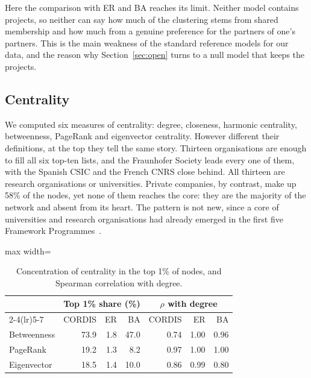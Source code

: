 \documentclass[sigchi]{acmart}
\begin{document}
Here the comparison with ER and BA reaches its limit. Neither model contains projects, so neither can say how much of the clustering stems from shared membership and how much from a genuine preference for the partners of one's partners. This is the main weakness of the standard reference models for our data, and the reason why Section~\ref{sec:open} turns to a null model that keeps the projects.

\subsection{Centrality}

We computed six measures of centrality: degree, closeness, harmonic centrality, betweenness, PageRank and eigenvector centrality. However different their definitions, at the top they tell the same story. Thirteen organisations are enough to fill all six top-ten lists, and the Fraunhofer Society leads every one of them, with the Spanish CSIC and the French CNRS close behind. All thirteen are research organisations or universities. Private companies, by contrast, make up 58\% of the nodes, yet none of them reaches the core: they are the majority of the network and absent from its heart. The pattern is not new, since a core of universities and research organisations had already emerged in the first five Framework Programmes~\cite{roediger2008}.

\begin{table}[t]
\caption{Concentration of centrality in the top 1\% of nodes, and Spearman correlation with degree.}
\label{tab:centrality}
\small
\begin{adjustbox}{max width=\columnwidth}
\begin{tabular}{lrrrrrr}
\toprule
 & \multicolumn{3}{c}{Top 1\% share (\%)} & \multicolumn{3}{c}{$\rho$ with degree} \\
\cmidrule(lr){2-4}\cmidrule(lr){5-7}
 & CORDIS & ER & BA & CORDIS & ER & BA \\
\midrule
Betweenness & 73.9 & 1.8 & 47.0 & 0.74 & 1.00 & 0.96 \\
PageRank & 19.2 & 1.3 & 8.2 & 0.97 & 1.00 & 1.00 \\
Eigenvector & 18.5 & 1.4 & 10.0 & 0.86 & 0.99 & 0.80 \\
\bottomrule
\end{tabular}
\end{adjustbox}
\end{table}
\end{document}
